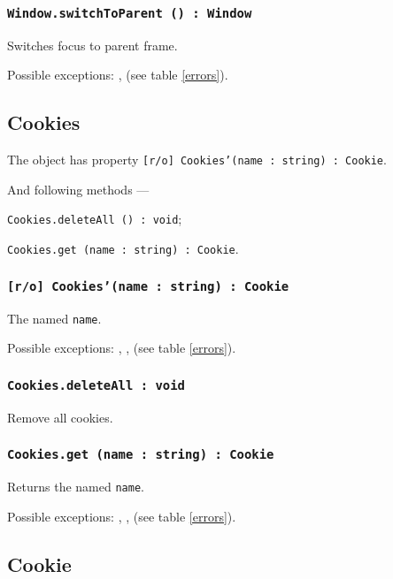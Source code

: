 \subsubsection{\texttt{Window.switchToParent () : Window}}

Switches focus to parent frame.

Possible exceptions: ,  (see table \ref{errors}).

\subsection{Cookies}

The object \cookies{} has property \texttt{[r/o] Cookies'(name : string) : Cookie}.

And following methods — 
\begin{icItems}
	\item \texttt{Cookies.deleteAll () : void};
	\item \texttt{Cookies.get (name : string) : Cookie}.
\end{icItems}

\subsubsection{\texttt{[r/o] Cookies'(name : string) : Cookie}}

The \cookie{} named \texttt{name}.

Possible exceptions: , ,  (see table \ref{errors}).

\subsubsection{\texttt{Cookies.deleteAll : void}}

Remove all cookies.

\subsubsection{\texttt{Cookies.get (name : string) : Cookie}}

Returns the \cookie{} named \texttt{name}.

Possible exceptions: , ,  (see table \ref{errors}).

\subsection{Cookie}

